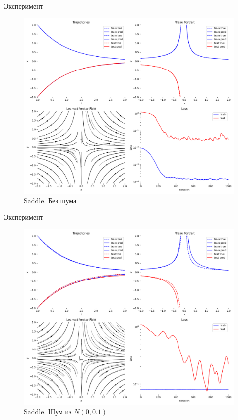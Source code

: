 \documentclass{beamer}
\begin{document}
\begin{frame}{Эксперимент}
\begin{figure}
 \centering
 \includegraphics[width=0.8\linewidth]{saddle-0.0}
 \caption{Saddle. Без шума}
\end{figure}
\end{frame}

\begin{frame}{Эксперимент}
\begin{figure}
 \centering
 \includegraphics[width=0.8\linewidth]{saddle-0.1}
 \caption{Saddle. Шум из $N(0, 0.1)$}
\end{figure}
\end{frame}
\end{document}
